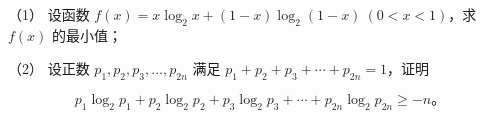 \begin{question}

（1） 设函数 $f(x)=x\log_2x+(1-x)\log_2(1-x)\ (0<x<1)$，求 $f(x)$ 的最小值；

（2） 设正数 $p_1,p_2,p_3,\ldots,p_{2n}$ 满足 $p_1+p_2+p_3+\cdots+p_{2n}=1$，证明

\nopagebreak[4]
\[
p_1\log_2p_1+p_2\log_2p_2+p_3\log_2p_3+\cdots+p_{2n}\log_2p_{2n}\geqslant-n\text{。}
\]

\end{question}